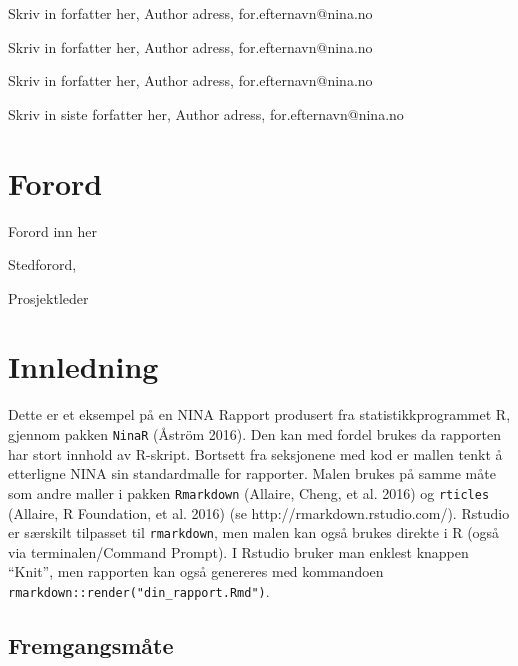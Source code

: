\documentclass[11pt, a4paper]{article}
\begin{document}
\vspace{1cm}
\small
Skriv in forfatter her, Author adress, for.efternavn@nina.no  \par
Skriv in forfatter her, Author adress, for.efternavn@nina.no  \par
Skriv in forfatter her, Author adress, for.efternavn@nina.no  \par
Skriv in siste forfatter her, Author adress, for.efternavn@nina.no  \par
\normalsize
\clearpage


\doublespacing
\tableofcontents
{}
\singlespacing
\clearpage

\section{Forord}

\normalsize
Forord inn her\par
\medskip
Stedforord, \par
\medskip
Prosjektleder



\clearpage
\setcounter{secnumdepth}{4}
\setlength{\parskip}{6pt}

\hypertarget{inl}{%
\section{Innledning}\label{inl}}

Dette er et eksempel på en NINA Rapport produsert fra
statistikkprogrammet R, gjennom pakken \texttt{NinaR} (Åström 2016). Den
kan med fordel brukes da rapporten har stort innhold av R-skript.
Bortsett fra seksjonene med kod er mallen tenkt å etterligne NINA sin
standardmalle for rapporter. Malen brukes på samme måte som andre maller
i pakken \texttt{Rmarkdown} (Allaire, Cheng, et al. 2016) og
\texttt{rticles} (Allaire, R Foundation, et al. 2016) (se
http://rmarkdown.rstudio.com/). Rstudio er særskilt tilpasset til
\texttt{rmarkdown}, men malen kan også brukes direkte i R (også via
terminalen/Command Prompt). I Rstudio bruker man enklest knappen
``Knit'', men rapporten kan også genereres med kommandoen
\texttt{rmarkdown::render("din\_rapport.Rmd")}.

\hypertarget{fremgangsmuxe5te}{%
\subsection{Fremgangsmåte}\label{fremgangsmuxe5te}}
\end{document}
